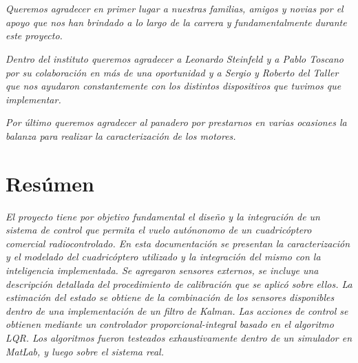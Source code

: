 \documentclass[main]{subfiles}
\begin{document}
\chapter*{}
\begin{flushright}
\textit{
Queremos agradecer en primer lugar a nuestras familias, amigos y novias 
por el apoyo que nos han brindado a lo largo de la carrera y fundamentalmente durante este proyecto.}
\end{flushright}

\begin{flushright}
\textit{
Dentro del instituto queremos agradecer a Leonardo Steinfeld y a Pablo Toscano por su colaboraci\'on en m\'as de una oportunidad y a Sergio y Roberto del Taller que nos ayudaron constantemente con los distintos dispositivos que tuvimos que implementar.
}
\end{flushright} 

\begin{flushright}
\textit{
Por \'ultimo queremos agradecer al panadero por prestarnos en varias ocasiones la balanza para realizar la caracterizaci\'on de los motores.
}
\end{flushright}



\chapter*{Res\'umen}
\begin{flushright}
\textit{El proyecto tiene por objetivo fundamental el diseño y la integración de un sistema de control que permita el vuelo autónonomo de un cuadricóptero comercial radiocontrolado. En esta documentaci\'on se presentan la caracterizaci\'on y el modelado del cuadric\'optero utilizado y la integraci\'on del mismo con la inteligencia implementada. Se agregaron sensores externos, se incluye una descripci\'on detallada del procedimiento de calibraci\'on que se aplic\'o sobre ellos. La estimaci\'on del estado se obtiene de la combinaci\'on de los sensores disponibles dentro de una implementaci\'on de un filtro de Kalman. Las acciones de control se obtienen mediante un controlador proporcional-integral basado en el algoritmo LQR. Los algoritmos fueron testeados exhaustivamente dentro de un simulador en MatLab, y luego sobre el sistema real.
}
\end{flushright}
\
\end{document}
